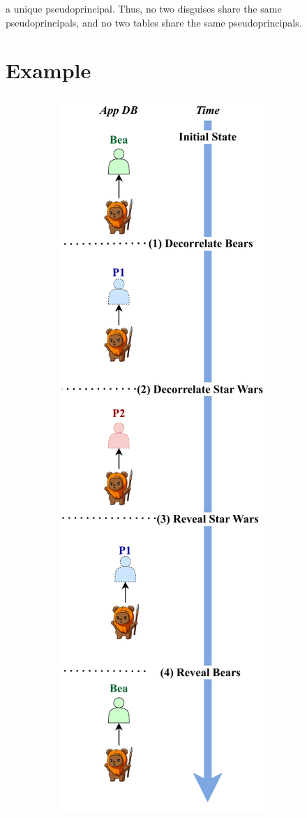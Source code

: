 a unique
pseudoprincipal.
%
Thus, no two disguises share the same pseudoprincipals, and no two tables share
the same pseudoprincipals.
%

\section{Example}
 \label{s:semantics:example}  
%
\begin{figure}
    \centering
    \begin{subfigure}[t]{.47\columnwidth}
    \centering
    \includegraphics[width=.75\textwidth]{figs/composition-hl-inorder}

\end{subfigure}
\end{figure}
